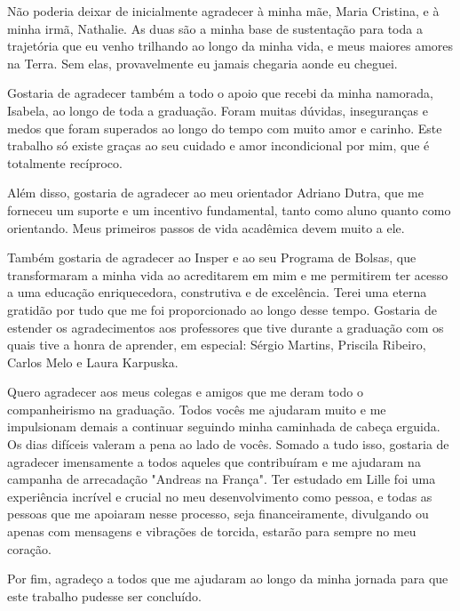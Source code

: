 \begin{agradecimentos}
Não poderia deixar de inicialmente agradecer à minha mãe, Maria Cristina, e à minha irmã, Nathalie. As duas são a minha base de sustentação para toda a trajetória que eu venho trilhando ao longo da minha vida, e meus maiores amores na Terra. Sem elas, provavelmente eu jamais chegaria aonde eu cheguei. \par

Gostaria de agradecer também a todo o apoio que recebi da minha namorada, Isabela, ao longo de toda a graduação. Foram muitas dúvidas, inseguranças e medos que foram superados ao longo do tempo com muito amor e carinho. Este trabalho só existe graças ao seu cuidado e amor incondicional por mim, que é totalmente recíproco. \par

Além disso, gostaria de agradecer ao meu orientador Adriano Dutra, que me forneceu um suporte e um incentivo fundamental, tanto como aluno quanto como orientando. Meus primeiros passos de vida acadêmica devem muito a ele. \par

Também gostaria de agradecer ao Insper e ao seu Programa de Bolsas, que transformaram a minha vida ao acreditarem em mim e me permitirem ter acesso a uma educação enriquecedora, construtiva e de excelência. Terei uma eterna gratidão por tudo que me foi proporcionado ao longo desse tempo. Gostaria de estender os agradecimentos aos professores que tive durante a graduação com os quais tive a honra de aprender, em especial: Sérgio Martins, Priscila Ribeiro, Carlos Melo e Laura Karpuska. \par

Quero agradecer aos meus colegas e amigos que me deram todo o companheirismo na graduação. Todos vocês me ajudaram muito e me impulsionam demais a continuar seguindo minha caminhada de cabeça erguida. Os dias difíceis valeram a pena ao lado de vocês. Somado a tudo isso, gostaria de agradecer imensamente a todos aqueles que contribuíram e me ajudaram na campanha de arrecadação "Andreas na França". Ter estudado em Lille foi uma experiência incrível e crucial no meu desenvolvimento como pessoa, e todas as pessoas que me apoiaram nesse processo, seja financeiramente, divulgando ou apenas com mensagens e vibrações de torcida, estarão para sempre no meu coração. \par

Por fim, agradeço a todos que me ajudaram ao longo da minha jornada para que este trabalho pudesse ser concluído.
\end{agradecimentos}